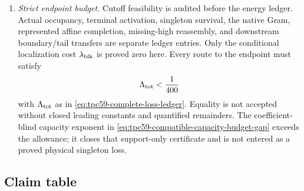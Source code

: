 \begin{enumerate}[label=\textup{(A\arabic*)},leftmargin=3.2em]
 \item \emph{Strict endpoint budget.}
       Cutoff feasibility is audited before the energy ledger.  Actual
       occupancy, terminal activation, singleton survival, the native Gram,
       represented affine completion, missing-high reassembly, and downstream
       boundary/tail transfers are separate ledger entries.  Only the
       conditional localization cost \(\lambda_{\rm blk}\) is proved zero
       here.  Every route to the endpoint must satisfy
       \begin{equation}
        \Lambda_{\rm tot}<\frac1{400}
        \label{eq:tpc59-audit-strict-budget}
       \end{equation}
       with \(\Lambda_{\rm tot}\) as in
       \eqref{eq:tpc59-complete-loss-ledger}.  Equality is not accepted
       without closed leading constants and quantified remainders.  The
       coefficient-blind capacity exponent in
       \eqref{eq:tpc59-compatible-capacity-budget-gap} exceeds the allowance;
       it closes that support-only certificate and is not entered as a
       proved physical singleton loss.
\end{enumerate}

\subsection{Claim table}

